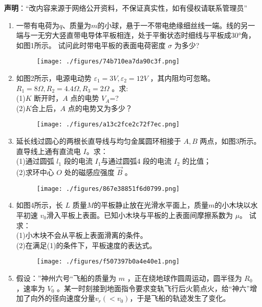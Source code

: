 
\textbf{声明}：“改内容来源于网络公开资料，不保证真实性，如有侵权请联系管理员”
\begin{enumerate}
\item 一带有电荷为$q$、质量为$m$的小球，悬于一不带电绝缘细丝线一端。线的另一端与一无穷大竖直带电导体平板相连，处于平衡状态时细线与平板成$30$°角，如图1所示。 试问此时带电平板的表面电荷密度 $\sigma$ 为多少?
\begin{figure}[ht]
\centering
\texttt{[image: ./figures/74b710ea7da90c3f.png]}
\caption{} \label{fig_ZKYP06_1}
\end{figure}
\item 如图2所示，电源电动势  $\varepsilon_1=3V,\varepsilon_2=12V$ ，其内阻均可忽略。 $R_1=8\Omega,R_2=4.4\Omega,R_3=2\Omega$  。求:\\
(1)$K$ 断开时，$A$  点的电势  $V_A$=?\\
(2)$K$合上后，$A$  点的电势又为多少？
\begin{figure}[ht]
\centering
\texttt{[image: ./figures/a13c2fce2c72f7ec.png]}
\caption{} \label{fig_ZKYP06_2}
\end{figure}
\item 延长线过圆心的两根长直导线与均匀金属圆环相接于 $A,B $ 两点，如图3所示。直导线上通有直流电 $I$。求：\\
(1)通过圆弧 $l_1$ 段的电流 $I_1 $与通过圆弧4 段的电流 $I_2$ 的比值；\\
(2)求环中心 $O$ 处的磁感应强度 $\vec B$ 。
\begin{figure}[ht]
\centering
\texttt{[image: ./figures/867e38851f6d0799.png]}
\caption{} \label{fig_ZKYP06_3}
\end{figure}
\item 如图4所示，长 $L$ 质量$M$的平板静止放在光滑水平面上，质量$m$的小木块以水平初速 $v_0$滑入平板上表面。已知小木块与平板的上表面间摩擦系数为 $\mu $。 试求：\\
(1)小木块不会从平板上表面滑离的条件。\\
(2)在满足(1)的条件下，平板速度的表达式。
\begin{figure}[ht]
\centering
\texttt{[image: ./figures/f507397b0a4e40e1.png]}
\caption{} \label{fig_ZKYP06_4}
\end{figure}
\item 假设：”神州六号“飞船的质量为 $m$ ，正在绕地球作圆周运动，圆半径为 $R_0$ ，速率为 $V_0$ 。某一时刻接到地面指令要求变轨飞行后火箭点火，给“神六”增加了向外的径向速度分量$v_r(<v_0)$，于是飞船的轨迹发生了变化。\\

\end{enumerate}

